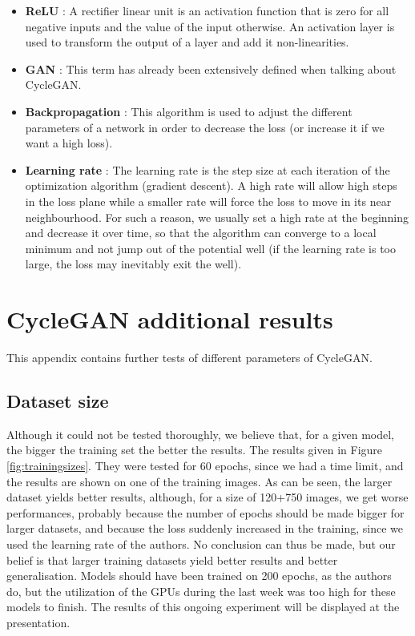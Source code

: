 \documentclass[twocolumn,superscriptaddress,aps,floatfix,nofootinbib]{revtex4-1}
\begin{document}
\begin{itemize}
        \item \textbf{ReLU} : A rectifier linear unit is an activation function that is zero for all negative inputs and the value of the input otherwise. An activation layer is used to transform the output of a layer and add it non-linearities.
        
        \item \textbf{GAN} : This term has already been extensively defined when talking about CycleGAN.
        
        \item \textbf{Backpropagation} : This algorithm is used to adjust the different parameters of a network in order to decrease the loss (or increase it if we want a high loss).
        
        \item \textbf{Learning rate} : The learning rate is the step size at each iteration of the optimization algorithm (gradient descent). A high rate will allow high steps in the loss plane while a smaller rate will force the loss to move in its near neighbourhood. For such a reason, we usually set a high rate at the beginning and decrease it over time, so that the algorithm can converge to a local minimum and not jump out of the potential well (if the learning rate is too large, the loss may inevitably exit the well).
    \end{itemize}
    
    
    
    \section{CycleGAN additional results}\label{add}
    
    This appendix contains further tests of different parameters of CycleGAN.
    
    \subsection{Dataset size}
    
    Although it could not be tested thoroughly, we believe that, for a given model, the bigger the training set the better the results. The results given in Figure \ref{fig:trainingsizes}. They were tested for 60 epochs, since we had a time limit, and the results are shown on one of the training images. As can be seen, the larger dataset yields better results, although, for a size of 120+750 images, we get worse performances, probably because the number of epochs should be made bigger for larger datasets, and because the loss suddenly increased in the training, since we used the learning rate of the authors. No conclusion can thus be made, but our belief is that larger training datasets yield better results and better generalisation. Models should have been trained on 200 epochs, as the authors do, but the utilization of the GPUs during the last week was too high for these models to finish. The results of this ongoing experiment will be displayed at the presentation.
    
\end{document}
